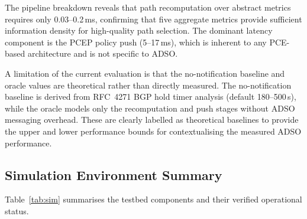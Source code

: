 \documentclass[conference]{IEEEtran}
\begin{document}
The pipeline breakdown reveals that path recomputation over abstract
metrics requires only 0.03--0.2\,ms, confirming that five aggregate
metrics provide sufficient information density for high-quality path
selection. The dominant latency component is the PCEP policy push
(5--17\,ms), which is inherent to any PCE-based architecture and is
not specific to ADSO.

A limitation of the current evaluation is that the no-notification
baseline and oracle values are theoretical rather than directly
measured. The no-notification baseline is derived from RFC~4271
BGP hold timer analysis (default 180--500\,s), while the oracle
models only the recomputation and push stages without ADSO messaging
overhead. These are clearly labelled as theoretical baselines to
provide the upper and lower performance bounds for contextualising
the measured ADSO performance.

\subsection{Simulation Environment Summary}

Table~\ref{tab:sim} summarises the testbed components and their
verified operational status.

\begin{table}[htbp]
\caption{Testbed Components and Operational Status}
\label{tab:sim}
\begin{center}
\renewcommand{\arraystretch}{1.2}
\end{center}
\end{table}
\end{document}
